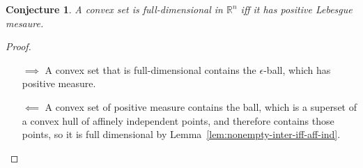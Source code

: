 \documentclass[12pt]{article}
\newcommand{\reals}{\mathbb{R}}
\newtheorem{conjecture}{Conjecture}
\begin{document}
\begin{conjecture}
A convex set is full-dimensional in $\reals^n$ iff it has positive Lebesgue mesaure.
\end{conjecture}
\begin{proof}

\begin{enumerate}
\item[$\implies$] A convex set that is full-dimensional contains the $\epsilon$-ball, which has positive measure. 
\item[$\impliedby$] A convex set of positive measure contains the ball, which is a superset of a convex hull of affinely independent points, and therefore contains those points, so it is full dimensional by Lemma~\ref{lem:nonempty-inter-iff-aff-ind}.
\end{enumerate}
\end{proof}
\end{document}
